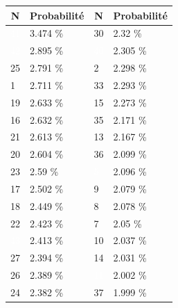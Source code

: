 \documentclass[letterpaper]{article}
\begin{document}
      \begin{table}[h]
	\centering
	\begin{tabular}{|l|l||l|l|}
	  \hline
	  \multicolumn{1}{|c|}{{\textbf{N}}} & %
	  \multicolumn{1}{c||}{\textbf{Probabilité}} & %
	  \multicolumn{1}{c|}{{\textbf{N}}} & %
	  \multicolumn{1}{c|}{\textbf{Probabilité}} \\ \hline
	  \cellcolor[HTML]{000000} \textcolor{white}{41} & 3.474 \%  & \cellcolor[HTML]{FFD700} 30 & 2.32 \%  \\ \hline
	  \cellcolor[HTML]{000000} \textcolor{white}{42} & 2.895 \%  & \cellcolor[HTML]{483D8B} \textcolor{white}{40} & 2.305 \% \\ \hline
	  \cellcolor[HTML]{FF4500} 25 & 2.791 \%  & \cellcolor[HTML]{A0522D}  2 & 2.298 \% \\ \hline
	  \cellcolor[HTML]{FFFFFF}  1 & 2.711 \%  & \cellcolor[HTML]{2E8B57} 33 & 2.293 \% \\ \hline
	  \cellcolor[HTML]{FF8C00} 19 & 2.633 \%  & \cellcolor[HTML]{FF69B4} 15 & 2.273 \% \\ \hline
	  \cellcolor[HTML]{E6E6FA} 16 & 2.632 \%  & \cellcolor[HTML]{2E8B57} 35 & 2.171 \% \\ \hline
	  \cellcolor[HTML]{FFFFFF} 21 & 2.613 \%  & \cellcolor[HTML]{FFFFF0} 13 & 2.167 \% \\ \hline
	  \cellcolor[HTML]{FF8C00} 20 & 2.604 \%  & \cellcolor[HTML]{E6E6FA} 36 & 2.099 \% \\ \hline
	  \cellcolor[HTML]{FFC1C1} 23 & 2.59 \%   & \cellcolor[HTML]{8B1A1A}  \textcolor{white}{5} & 2.096 \% \\ \hline
	  \cellcolor[HTML]{FF8C00} 17 & 2.502 \%  & \cellcolor[HTML]{1E90FF}  9 & 2.079 \% \\ \hline
	  \cellcolor[HTML]{EEEED1} 18 & 2.449 \%  & \cellcolor[HTML]{FFC1C1}  8 & 2.078 \% \\ \hline
	  \cellcolor[HTML]{FF4500} 22 & 2.423 \%  & \cellcolor[HTML]{1E90FF}  7 & 2.05 \%  \\ \hline
	  \cellcolor[HTML]{000000} \textcolor{white}{43} & 2.413 \%  & \cellcolor[HTML]{1E90FF} 10 & 2.037 \% \\ \hline
	  \cellcolor[HTML]{FFD700} 27 & 2.394 \%  & \cellcolor[HTML]{FF69B4} 14 & 2.031 \% \\ \hline
	  \cellcolor[HTML]{E6E6FA} 26 & 2.389 \%  & \cellcolor[HTML]{000000} \textcolor{white}{11} & 2.002 \% \\ \hline
	  \cellcolor[HTML]{FF4500} 24 & 2.382 \%  & \cellcolor[HTML]{FFC1C1} 37 & 1.999 \% \\ \hline

\end{tabular}
\end{table}
\end{document}
